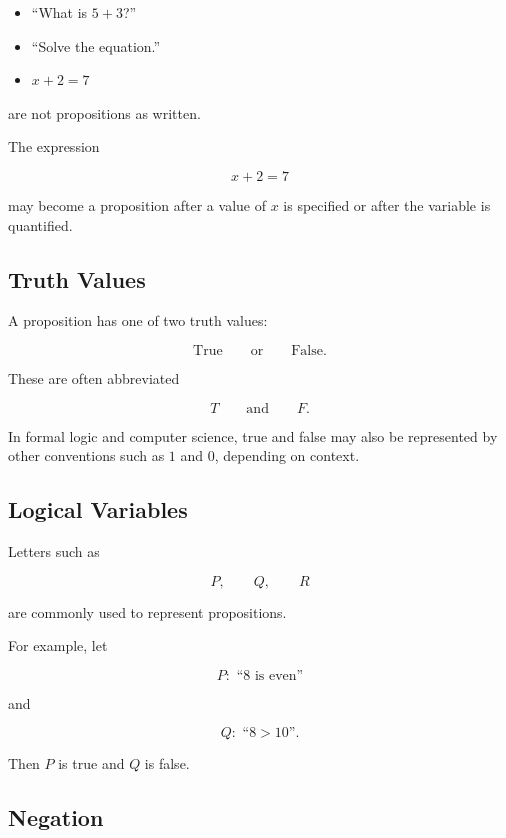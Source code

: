 \begin{itemize}
    \item ``What is \(5+3\)?''
    \item ``Solve the equation.''
    \item \(x+2=7\)
\end{itemize}

are not propositions as written.

The expression

\[ x+2=7 \]

may become a proposition after a value of \(x\) is specified or after the
variable is quantified.

\subsection{Truth Values}
\label{subsec:truth-values}

A proposition has one of two truth values:

\[ \text{True}\qquad\text{or}\qquad\text{False}. \]

These are often abbreviated

\[ T\qquad\text{and}\qquad F. \]

In formal logic and computer science, true and false may also be represented
by other conventions such as \(1\) and \(0\), depending on context.

\subsection{Logical Variables}
\label{subsec:logical-variables}

Letters such as

\[ P,\qquad Q,\qquad R \]

are commonly used to represent propositions.

For example, let

\[ P:\text{ ``\(8\) is even''} \]

and

\[ Q:\text{ ``\(8>10\)''}. \]

Then \(P\) is true and \(Q\) is false.

\subsection{Negation}
\label{subsec:negation}

